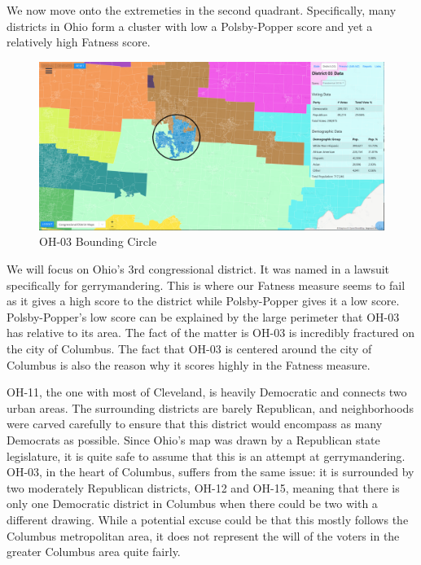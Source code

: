 \documentclass[letterpaper]{article}
\begin{document}
We now move onto the extremeties in the second quadrant. Specifically, many districts in Ohio form a cluster with low a Polsby-Popper score and yet a relatively high Fatness score.

\begin{figure}[H]
	\includegraphics[width=\linewidth]{./figures/OH-03-BoundingCircle.png}
	\caption{OH-03 Bounding Circle}
	\label{fig:oh03boundingCircle}
\end{figure}

We will focus on Ohio's 3rd congressional district. It was named in a lawsuit specifically for gerrymandering. This is where our Fatness measure seems to fail as it gives a high score to the district while Polsby-Popper gives it a low score. Polsby-Popper's low score can be explained by the large perimeter that OH-03 has relative to its area. The fact of the matter is OH-03 is incredibly fractured on the city of Columbus. The fact that OH-03 is centered around the city of Columbus is also the reason why it scores highly in the Fatness measure.

OH-11, the one with most of Cleveland, is heavily Democratic and connects two urban areas. The surrounding districts are barely Republican, and neighborhoods were carved carefully to ensure that this district would encompass as many Democrats as possible. Since Ohio’s map was drawn by a Republican state legislature, it is quite safe to assume that this is an attempt at gerrymandering. OH-03, in the heart of Columbus, suffers from the same issue: it is surrounded by two moderately Republican districts, OH-12 and OH-15, meaning that there is only one Democratic district in Columbus when there could be two with a different drawing.  While a potential excuse could be that this mostly follows the Columbus metropolitan area, it does not represent the will of the voters in the greater Columbus area quite fairly. 
\end{document}
